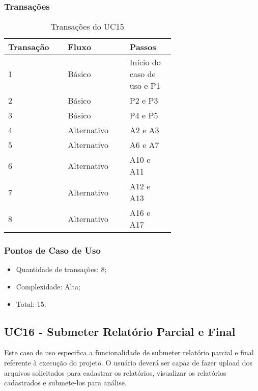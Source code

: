   \subsubsection{Transações}

  \begin{table*}[!h]
  \centering
  \caption{Transações do UC15}
  \label{uc15_transactions}
    \begin{tabular}{|p{0.20\linewidth}|p{0.25\linewidth}|p{0.20\linewidth}|}
    \hline
    \textbf{Transação} & \textbf{Fluxo} & \textbf{Passos} \\ 
    \hline
    1 & Básico & Início do caso de uso e P1\\
    \hline
    2 & Básico & P2 e P3\\
    \hline
    3 & Básico & P4 e P5\\
    \hline
    4 & Alternativo & A2 e A3\\
    \hline
    5 & Alternativo & A6 e A7\\
    \hline
    6 & Alternativo & A10 e A11\\
    \hline
    7 & Alternativo & A12 e A13\\
    \hline
    8 & Alternativo & A16 e A17\\
    \hline
    \end{tabular}
  \end{table*}

  \subsubsection{Pontos de Caso de Uso}

  \begin{itemize}
  \item Quantidade de transações: 8;
  \item Complexidade: Alta;
  \item Total: 15.
  \end{itemize}

  \vfill
  
\pagebreak
\subsection{UC16 - Submeter Relatório Parcial e Final}
  
  Este caso de uso especifica a funcionalidade de submeter relatório parcial e final referente à execução do projeto.
  O usuário deverá ser capaz de fazer upload dos arquivos solicitados para cadastrar os relatórios, visualizar os
  relatórios cadastrados e submete-los para análise.
  
